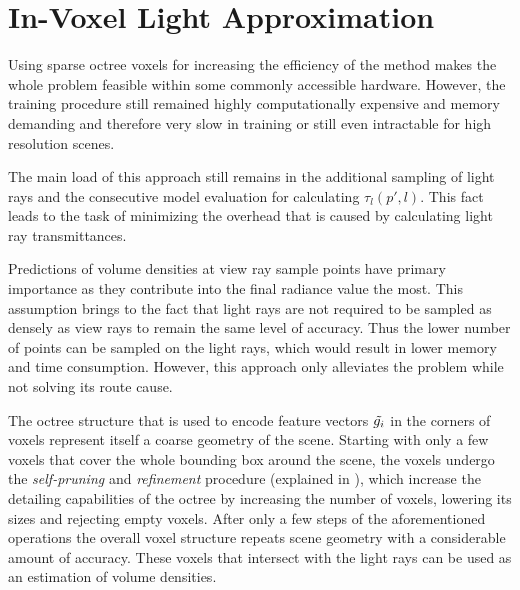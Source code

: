 \section{In-Voxel Light Approximation}

Using sparse octree voxels for increasing the efficiency of the method
makes the whole problem feasible within some commonly accessible hardware.
However, the training procedure still remained highly computationally expensive and memory demanding
and therefore very slow in training or still even intractable for high resolution scenes.

The main load of this approach still remains in the additional sampling of light rays
and the consecutive model evaluation for calculating $\tau_l(p', l)$.
This fact leads to the task of minimizing the overhead that is caused by calculating light ray transmittances.

Predictions of volume densities at view ray sample points have primary importance
as they contribute into the final radiance value the most.
This assumption brings to the fact that light rays are not required
to be sampled as densely as view rays to remain the same level of accuracy.
Thus the lower number of points can be sampled on the light rays,
which would result in lower memory and time consumption.
However, this approach only alleviates the problem while not solving its route cause.

The octree structure that is used to encode feature vectors $\Tilde{g_i}$ in the corners of voxels
represent itself a coarse geometry of the scene.
Starting with only a few voxels that cover the whole bounding box around the scene,
the voxels undergo the \textit{self-pruning} and \textit{refinement} procedure (explained in ),
which increase the detailing capabilities of the octree
by increasing the number of voxels, lowering its sizes and rejecting empty voxels.
After only a few steps of the aforementioned operations the overall voxel structure
repeats scene geometry with a considerable amount of accuracy.
These voxels that intersect with the light rays can be used as an estimation of volume densities.

